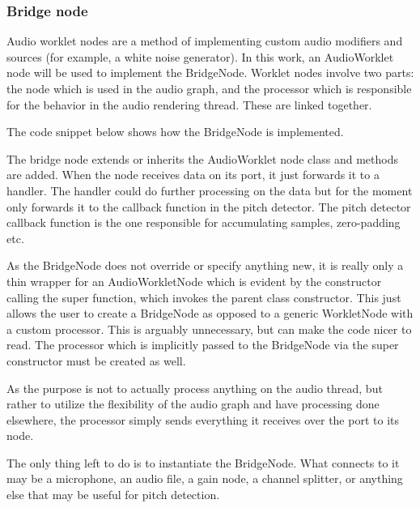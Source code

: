 \subsubsection{Bridge node}
Audio worklet nodes are a method of implementing custom audio modifiers and sources (for example, a white noise generator). In this work, an AudioWorklet node will be used to implement the BridgeNode. Worklet nodes involve two parts: the node which is used in the audio graph, and the processor which is responsible for the behavior in the audio rendering thread. These are linked together.

The code snippet below shows how the BridgeNode is implemented.

The bridge node extends or inherits the AudioWorklet node class and methods are added. When the node receives data on its port, it just forwards it to a handler. The handler could do further processing on the data but for the moment only forwards it to the callback function in the pitch detector. The pitch detector callback function is the one responsible for accumulating samples, zero-padding etc.

As the BridgeNode does not override or specify anything new, it is really only a thin wrapper for an AudioWorkletNode which is evident by the constructor calling the super function, which invokes the parent class constructor. This just allows the user to create a BridgeNode as opposed to a generic WorkletNode with a custom processor. This is arguably unnecessary, but can make the code nicer to read. The processor which is implicitly passed to the BridgeNode via the super constructor must be created as well.



As the purpose is not to actually process anything on the audio thread, but rather to utilize the flexibility of the audio graph and have processing done elsewhere, the processor simply sends everything it receives over the port to its node. 

The only thing left to do is to instantiate the BridgeNode. What connects to it may be a microphone, an audio file, a gain node, a channel splitter, or anything else that may be useful for pitch detection.


